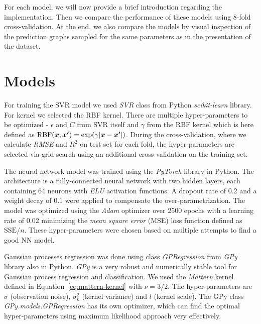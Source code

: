 For each model, we will now provide a brief introduction regarding the implementation. Then we compare the performance of these models using 8-fold cross-validation. At the end, we also compare the models by visual inspection of the prediction graphs sampled for the same parameters as in the presentation of the dataset.

\section{Models}
\label{sec:temp-models}

For training the SVR model we used \textit{SVR} class from Python \textit{scikit-learn} library. For kernel we selected the RBF kernel. There are multiple hyper-parameters to be optimized - $\epsilon$ and $C$ from SVR itself and $\gamma$ from the RBF kernel which is here defined as $\mathrm{RBF}(\bm{x},\bm{x^\prime}) = \mathrm{exp}(\gamma \lvert \bm{x}-\bm{x^\prime} \rvert)$. During the cross-validation, where we calculate \textit{RMSE} and $R^2$ on test set for each fold, the hyper-parameters are selected via grid-search using an additional cross-validation on the training set.

The neural network model was trained using the \textit{PyTorch} library in Python. The architecture is a fully-connected neural network with two hidden layers, each containing 64 neurons with \textit{ELU} activation functions. A dropout rate of 0.2 and a weight decay of $0.1$ were applied to compensate the over-parametrization. The model was optimized using the \textit{Adam} optimizer over 2500 epochs with a learning rate of 0.02 minimizing the \textit{mean square error} (MSE) loss function defined as $\mathrm{SSE}/n$. These hyper-parameters were chosen based on multiple attempts to find a good NN model.

Gaussian processes regression was done using class \textit{GPRegression} from \textit{GPy} library also in Python. \textit{GPy} is a very robust and numerically stable tool for Gaussian process regression and classification. We used the \textit{Mattern} kernel defined in Equation~\ref{eq:mattern-kernel} with $\nu = 3/2$. The hyper-parameters are $\sigma$ (observation noise), $\sigma_k^2$ (kernel variance) and $l$ (kernel scale). The GPy class \textit{GPy.models.GPRegression} has its own optimizer, which can find the optimal hyper-parameters using maximum likelihood approach very effectively. 

